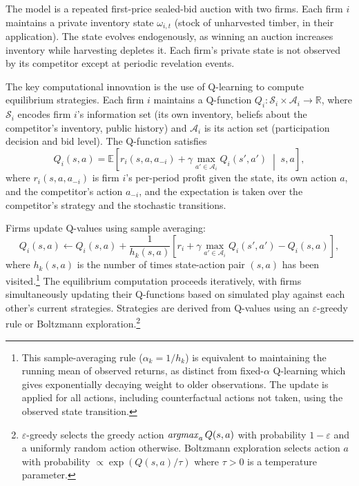 The model is a repeated first-price sealed-bid auction with two firms. Each firm $i$ maintains a private inventory state $\omega_{i,t}$ (stock of unharvested timber, in their application). The state evolves endogenously, as winning an auction increases inventory while harvesting depletes it. Each firm's private state is not observed by its competitor except at periodic revelation events.

The key computational innovation is the use of Q-learning to compute equilibrium strategies. Each firm $i$ maintains a Q-function $Q_i: \mathcal{S}_i \times \mathcal{A}_i \to \mathbb{R}$, where $\mathcal{S}_i$ encodes firm $i$'s information set (its own inventory, beliefs about the competitor's inventory, public history) and $\mathcal{A}_i$ is its action set (participation decision and bid level). The Q-function satisfies
\begin{equation}
Q_i(s, a) = \mathbb{E}\left[r_i(s, a, a_{-i}) + \gamma \max_{a' \in \mathcal{A}_i} Q_i(s', a') \;\middle|\; s, a\right], \label{eq:asker_bellman}
\end{equation}
where $r_i(s, a, a_{-i})$ is firm $i$'s per-period profit given the state, its own action $a$, and the competitor's action $a_{-i}$, and the expectation is taken over the competitor's strategy and the stochastic transitions.

Firms update Q-values using sample averaging:
\begin{equation}
Q_i(s, a) \leftarrow Q_i(s, a) + \frac{1}{h_k(s,a)}\left[r_i + \gamma \max_{a' \in \mathcal{A}_i} Q_i(s', a') - Q_i(s, a)\right], \label{eq:asker_qupdate}
\end{equation}
where $h_k(s,a)$ is the number of times state-action pair $(s,a)$ has been visited.\footnote{This sample-averaging rule ($\alpha_k = 1/h_k$) is equivalent to maintaining the running mean of observed returns, as distinct from fixed-$\alpha$ Q-learning which gives exponentially decaying weight to older observations. The update is applied for all actions, including counterfactual actions not taken, using the observed state transition.} The equilibrium computation proceeds iteratively, with firms simultaneously updating their Q-functions based on simulated play against each other's current strategies. Strategies are derived from Q-values using an $\varepsilon$-greedy rule or Boltzmann exploration.\footnote{$\varepsilon$-greedy selects the greedy action $\mathop{\it argmax}_a Q(s,a)$ with probability $1-\varepsilon$ and a uniformly random action otherwise. Boltzmann exploration selects action $a$ with probability $\propto \exp(Q(s,a)/\tau)$ where $\tau > 0$ is a temperature parameter.}

